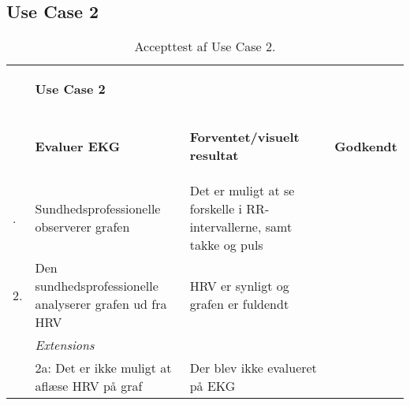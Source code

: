 \subsection{Use Case 2}

\begin{table}[H]
    \begin{tabularx}{\textwidth}{l X X %
    c}
     \toprule
     ~ & \begin{large}\textbf{Use Case 2} \end{large} & ~ & ~ \\  
     ~ & \begin{large}\textbf{Evaluer EKG} \end{large}	  
     & \begin{large} \textbf{Forventet/visuelt resultat}\end{large} 
     & \begin{large} \textbf{Godkendt} \end{large}      
     \\     	 \midrule \addlinespace[3mm]                                                                                                                                                            
                         1. &  Sundhedsprofessionelle observerer grafen
     					    &  Det er muligt at se forskelle i RR-intervallerne, samt takke og puls
     					    
     					    &  %
     					             \\	\midrule	
     					    
                         2. &  Den sundhedsprofessionelle analyserer grafen ud fra HRV
     					    &  HRV er synligt og grafen er fuldendt
     					    &  %
     					        \\ \midrule   
                         ~  &  \textit{Extensions}
     					    &  ~  
     					    &  ~         \\	\midrule
                         ~  &  2a: Det er ikke muligt at aflæse HRV på graf
     					    &  Der blev ikke evalueret på EKG 
     					    &  %
     					    \\
    					         					         	
	\bottomrule   
    \end{tabularx}
    \caption {Accepttest af Use Case 2.}
    \label{tab:AT_UC1}
\end{table}
